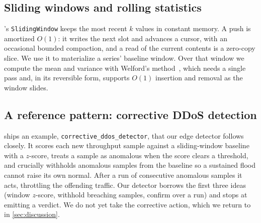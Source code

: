 \subsection{Sliding windows and rolling statistics}
\dc{}'s \texttt{SlidingWindow} keeps the most recent $k$ values in constant memory.
A push is amortized $O(1)$: it writes the next slot and advances a cursor, with an
occasional bounded compaction, and a read of the current contents is a zero-copy
slice. We use it to materialize a series' baseline window. Over that window we
compute the mean and variance with Welford's method~\citep{welford1962}, which
needs a single pass and, in its reversible form, supports $O(1)$ insertion and
removal as the window slides.

\subsection{A reference pattern: corrective DDoS detection}
\dc{} ships an example, \texttt{corrective\_\allowbreak ddos\_\allowbreak detector},
that our edge detector follows closely. It scores each new throughput sample against a sliding-window
baseline with a $z$-score, treats a sample as anomalous when the score clears a
threshold, and crucially withholds anomalous samples from the baseline so a
sustained flood cannot raise its own normal. After a run of consecutive anomalous
samples it acts, throttling the offending traffic. Our detector borrows the first
three ideas (window $z$-score, withhold breaching samples, confirm over a run) and
stops at emitting a verdict. We do not yet take the corrective action, which we
return to in \cref{sec:discussion}.
